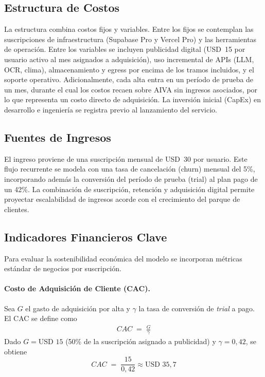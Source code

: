 \subsection{Estructura de Costos}
La estructura combina costos fijos y variables. Entre los fijos se contemplan las suscripciones de infraestructura (Supabase Pro y Vercel Pro) y las herramientas de operación. Entre los variables se incluyen publicidad digital (USD~15 por usuario activo al mes asignados a adquisición), uso incremental de APIs (LLM, OCR, clima), almacenamiento y egress por encima de los tramos incluidos, y el soporte operativo. Adicionalmente, cada alta entra en un período de prueba de un mes, durante el cual los costos recaen sobre AIVA sin ingresos asociados, por lo que representa un costo directo de adquisición. La inversión inicial (CapEx) en desarrollo e ingeniería se registra previo al lanzamiento del servicio.

\subsection{Fuentes de Ingresos}
El ingreso proviene de una suscripción mensual de USD~30 por usuario. Este flujo recurrente se modela con una tasa de cancelación (churn) mensual del 5\%, incorporando además la conversión del período de prueba (trial) al plan pago de un 42\%. La combinación de suscripción, retención y adquisición digital permite proyectar escalabilidad de ingresos acorde con el crecimiento del parque de clientes.

\subsection{Indicadores Financieros Clave}
Para evaluar la sostenibilidad económica del modelo se incorporan métricas estándar de negocios por suscripción.

\paragraph{Costo de Adquisición de Cliente (CAC).}
Sea $G$ el gasto de adquisición por alta y $\gamma$ la tasa de conversión de \emph{trial} a pago. El CAC se define como
\begin{align}
CAC \;=\; \frac{G}{\gamma}
\end{align}
Dado $G = \text{USD }15$ (50\% de la suscripción asignado a publicidad) y $\gamma = 0{,}42$, se obtiene
\[
CAC \;=\; \frac{15}{0{,}42} \approx \text{USD }35{,}7
\]


